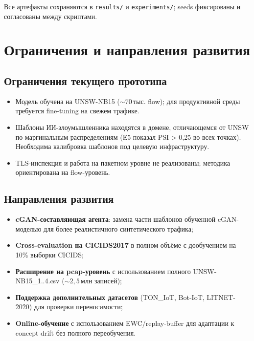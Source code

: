 \documentclass[14pt, a4paper]{extarticle}
\begin{document}
Все артефакты сохраняются в \texttt{results/} и \texttt{experiments/};
seeds фиксированы и согласованы между скриптами.

\section{Ограничения и направления развития}

\subsection{Ограничения текущего прототипа}

\begin{itemize}
    \item Модель обучена на UNSW-NB15 (\(\sim 70\,\text{тыс.}\) flow);
    для продуктивной среды требуется fine-tuning на свежем трафике.
    \item Шаблоны ИИ-злоумышленника находятся в домене,
    отличающемся от UNSW по маргинальным распределениям (E5 показал
    PSI > 0{,}25 во всех точках). Необходима калибровка шаблонов
    под целевую инфраструктуру.
    \item TLS-инспекция и работа на пакетном уровне не реализованы;
    методика ориентирована на flow-уровень.
\end{itemize}

\subsection{Направления развития}

\begin{itemize}
    \item \textbf{cGAN-составляющая агента}: замена части шаблонов
    обученной cGAN-моделью для более реалистичного синтетического
    трафика;
    \item \textbf{Cross-evaluation на CICIDS2017} в полном объёме с
    дообучением на 10\% выборки CICIDS;
    \item \textbf{Расширение на pcap-уровень} с использованием полного
    UNSW-NB15\_1..4.csv (\(\sim 2{,}5\,\text{млн}\) записей);
    \item \textbf{Поддержка дополнительных датасетов} (TON\_IoT,
    Bot-IoT, LITNET-2020) для проверки переносимости;
    \item \textbf{Online-обучение} с использованием
    EWC/replay-buffer для адаптации к concept drift без полного
    переобучения.
\end{itemize}

\printbibliography[title={СПИСОК ИСПОЛЬЗОВАННЫХ ИСТОЧНИКОВ}]
\end{document}
